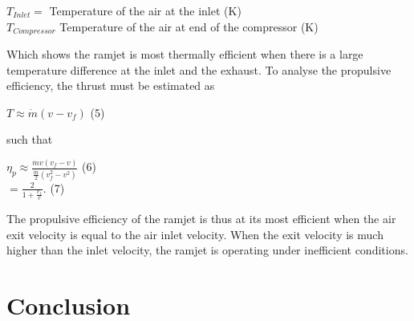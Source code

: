 \documentclass[12pt,onecolumn]{IEEEtran}
\begin{document}
\begin{flushleft}
\begin{center}
\vspace{1mm}
$T_{Inlet} = $ Temperature of the air at the inlet (K)\\
\vspace{1mm}
$T_{Compressor} $ Temperature of the air at end of the compressor (K)\\
\end{center}
Which shows the ramjet is most thermally efficient when there is a large temperature difference at the inlet and the exhaust.
\vspace{3mm}
To analyse the propulsive efficiency, the thrust must be estimated as\\
\begin{center}
$T\approx\dot{m}(v-v_f)$ (5)
\end{center}
\vspace{1mm}
such that\\
\begin{center}
$\eta_p\approx\frac{\dot{m}v(v_f-v)}{\frac{\dot{m}}{2}(v_f^2-v^2)}$ (6)\\
\vspace{1mm}
$=\frac{2}{1+\frac{v_f}{v}}$. (7)
\end{center}
The propulsive efficiency of the ramjet is thus at its most efficient when the air exit velocity is equal to the air inlet velocity. When the exit velocity is much higher than the inlet velocity, the ramjet is operating under inefficient conditions.
\end{flushleft}
\section{Conclusion}



\end{document}

